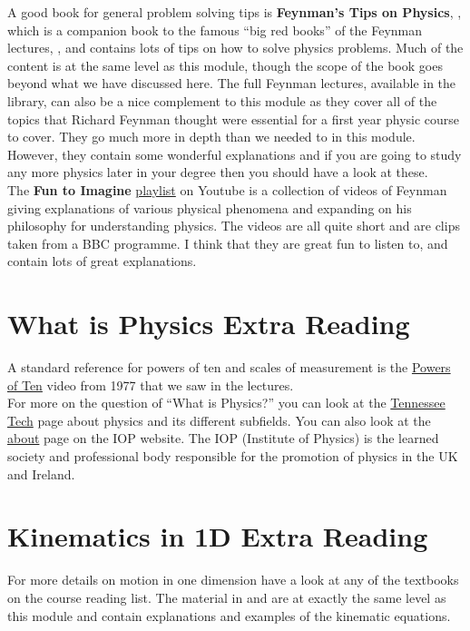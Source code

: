 \documentclass[a4paper,12pt]{book}
\begin{document}
A good book for general problem solving tips is \textbf{Feynman's Tips on Physics}, \citep{feynmantips}, which is a companion book to the famous ``big red books'' of the Feynman lectures, \citep{feynmanv1,feynmanv2,feynmanv3}, and contains lots of tips on how to solve physics problems. Much of the content is at the same level as this module, though the scope of the book goes beyond what we have discussed here.  The full Feynman lectures, available in the library, can also be a nice complement to this module as they cover all of the topics that Richard Feynman thought were essential for a first year physic course to cover. They go much more in depth than we needed to in this module. However, they contain some wonderful explanations and if you are going to study any more physics later in your degree then you should have a look at these.\\

The \textbf{Fun to Imagine} \href{https://www.youtube.com/playlist?app=desktop&list=PL2D30B1DEFFDA0310}{playlist} on Youtube is a collection of videos of Feynman giving explanations of various physical phenomena and expanding on his philosophy for understanding physics.  The videos are all quite short and are clips taken from a BBC programme. I think that they are great fun to listen to, and contain lots of great explanations.

\section{What is Physics Extra Reading}
A standard reference for powers of ten and scales of measurement is the \href{https://www.youtube.com/watch?v=0fKBhvDjuy0}{Powers of Ten} video from 1977 that we saw in the lectures.\\

For more on the question of ``What is Physics?'' you can look at the \href{https://www.tntech.edu/cas/physics/aboutphys/about-physics.php}{Tennessee Tech} page about physics and its different subfields. You can also look at the \href{https://www.iop.org/about}{about} page on the IOP website. The IOP (Institute of Physics) is the learned society and professional body responsible for the promotion of physics in the UK and Ireland.

\section{Kinematics in 1D Extra Reading}
For more details on motion in one dimension have a look at any of the textbooks on the course reading list. The material in \citep{breithaupt2016aqa} and \citep{breithaupt2016aqa_AS} are at exactly the same level as this module and contain explanations and examples of the kinematic equations.\\
\end{document}
